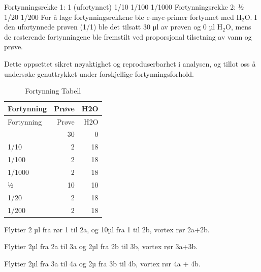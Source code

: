 \documentclass[
  letterpaper,
  DIV=11,
  numbers=noendperiod]{scrreprt}
\begin{document}
Fortynningsrekke 1: 1 (ufortynnet) 1/10 1/100 1/1000 Fortynningsrekke 2:
½ 1/20 1/200 For å lage fortynningsrekkene ble c-myc-primer fortynnet
med H\(_2\)O. I den ufortynnede prøven (1/1) ble det tilsatt 30 µl av
prøven og 0 µl H\(_2\)O, mens de resterende fortynningene ble fremstilt
ved proporsjonal tilsetning av vann og prøve.

Dette oppsettet sikret nøyaktighet og reproduserbarhet i analysen, og
tillot oss å undersøke genuttrykket under forskjellige
fortynningsforhold.

\begin{longtable}[]{@{}lrr@{}}
\caption{Fortynning Tabell}\tabularnewline
\toprule\noalign{}
Fortynning & Prøve & H2O \\
\midrule\noalign{}
\endfirsthead
\toprule\noalign{}
Fortynning & Prøve & H2O \\
\midrule\noalign{}
\endhead
\bottomrule\noalign{}
\endlastfoot
1 & 30 & 0 \\
1/10 & 2 & 18 \\
1/100 & 2 & 18 \\
1/1000 & 2 & 18 \\
½ & 10 & 10 \\
1/20 & 2 & 18 \\
1/200 & 2 & 18 \\
\end{longtable}

Flytter 2 µl fra rør 1 til 2a, og 10µl fra 1 til 2b, vortex rør 2a+2b.

Flytter 2µl fra 2a til 3a og 2µl fra 2b til 3b, vortex rør 3a+3b.

Flytter 2µl fra 3a til 4a og 2µ fra 3b til 4b, vortex rør 4a + 4b.
\end{document}
